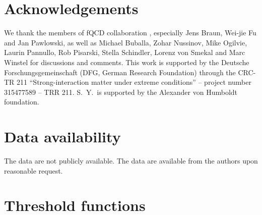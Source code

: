 \documentclass[reprint,english,superscriptaddress,preprintnumbers,amsmath,amssymb,aps,prd]{revtex4-2}
\begin{document}
\section{Acknowledgements}
%
We thank the members of fQCD collaboration \cite{fQCD}, especially Jens Braun, Wei-jie Fu and Jan Pawlowski, as well as Michael Buballa, Zohar Nussinov, Mike Ogilvie, Laurin Pannullo, Rob Pisarski, Stella Schindler, Lorenz von Smekal and Marc Winstel for discussions and comments. This work is supported by the Deutsche Forschungsgemeinschaft (DFG, German Research Foundation) through the CRC-TR 211 ``Strong-interaction matter under extreme conditions'' -- project number 315477589 -- TRR 211. S.\ Y.\ is supported by the Alexander von Humboldt foundation.
\section{Data availability}
%
The data are not publicly available. The data are available from the authors upon reasonable request.

\appendix

\renewcommand{\thesection}{\Alph{section}}
\renewcommand{\theequation}{\Alph{section}\arabic{equation}}

\section{Threshold functions}\label{app:thre_fun}
\end{document}
